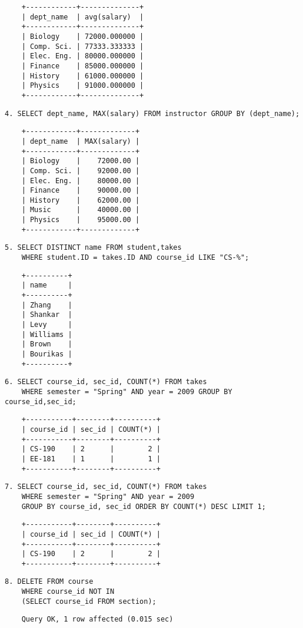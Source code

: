 \documentclass{article}
\begin{document}
\begin{lstlisting}
    +------------+--------------+
    | dept_name  | avg(salary)  |
    +------------+--------------+
    | Biology    | 72000.000000 |
    | Comp. Sci. | 77333.333333 |
    | Elec. Eng. | 80000.000000 |
    | Finance    | 85000.000000 |
    | History    | 61000.000000 |
    | Physics    | 91000.000000 |
    +------------+--------------+    
\end{lstlisting}

\pagebreak

\begin{lstlisting}
4. SELECT dept_name, MAX(salary) FROM instructor GROUP BY (dept_name);
\end{lstlisting}
\begin{lstlisting}
    +------------+-------------+
    | dept_name  | MAX(salary) |
    +------------+-------------+
    | Biology    |    72000.00 |
    | Comp. Sci. |    92000.00 |
    | Elec. Eng. |    80000.00 |
    | Finance    |    90000.00 |
    | History    |    62000.00 |
    | Music      |    40000.00 |
    | Physics    |    95000.00 |
    +------------+-------------+
\end{lstlisting}
\begin{lstlisting}
5. SELECT DISTINCT name FROM student,takes
    WHERE student.ID = takes.ID AND course_id LIKE "CS-%";
\end{lstlisting}
\begin{lstlisting}
    +----------+
    | name     |
    +----------+
    | Zhang    |
    | Shankar  |
    | Levy     |
    | Williams |
    | Brown    |
    | Bourikas |
    +----------+
\end{lstlisting}
\begin{lstlisting}
6. SELECT course_id, sec_id, COUNT(*) FROM takes
    WHERE semester = "Spring" AND year = 2009 GROUP BY course_id,sec_id;
\end{lstlisting}
\begin{lstlisting}
    +-----------+--------+----------+
    | course_id | sec_id | COUNT(*) |
    +-----------+--------+----------+
    | CS-190    | 2      |        2 |
    | EE-181    | 1      |        1 |
    +-----------+--------+----------+    
\end{lstlisting}
\begin{lstlisting}
7. SELECT course_id, sec_id, COUNT(*) FROM takes 
    WHERE semester = "Spring" AND year = 2009
    GROUP BY course_id, sec_id ORDER BY COUNT(*) DESC LIMIT 1;
\end{lstlisting}
\begin{lstlisting}
    +-----------+--------+----------+
    | course_id | sec_id | COUNT(*) |
    +-----------+--------+----------+
    | CS-190    | 2      |        2 |
    +-----------+--------+----------+
\end{lstlisting}
\begin{lstlisting}
8. DELETE FROM course 
    WHERE course_id NOT IN 
    (SELECT course_id FROM section);
\end{lstlisting}
\begin{lstlisting}
    Query OK, 1 row affected (0.015 sec)
\end{lstlisting}
\end{document}
